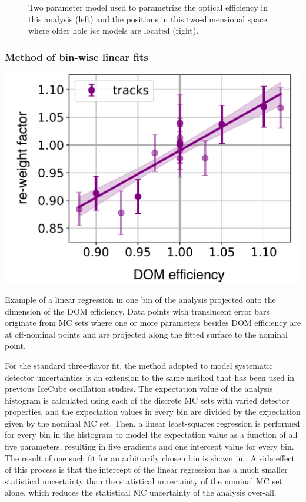 \begin{figure}
    \centering
    
    
    \caption{Two parameter model used to parametrize the optical efficiency in this analysis (left) and the positions in this two-dimensional space where older hole ice models are located (right).}
    \label{fig:hole-ice-parametrization}
\end{figure}

\subsubsection{Method of bin-wise linear fits}
\label{sec:hypersurfaces}
\begin{marginfigure}[\baselineskip]
    \includegraphics[width=\linewidth]{figures/measurement/systematics/detector/hypersurface_example_v2.pdf} 
    \caption{Example of a linear regression in one bin of the analysis projected onto the dimension of the DOM efficiency. Data points with translucent error bars originate from MC sets where one or more parameters besides DOM efficiency are at off-nominal points and are projected along the fitted surface to the nominal point.}
\end{marginfigure}
For the standard three-flavor fit, the method adopted to model systematic detector uncertainties is an extension to the same method that has been used in previous IceCube oscillation studies\cite{IceCube:2019dqi}. The expectation value of the analysis histogram is calculated using each of the discrete MC sets with varied detector properties, and the expectation values in every bin are divided by the expectation given by the nominal MC set. Then, a linear least-squares regression is performed for every bin in the histogram to model the expectation value as a function of all five parameters, resulting in five gradients and one intercept value for every bin. The result of one such fit for an arbitrarily chosen bin is shown in . A side effect of this process is that the intercept of the linear regression has a much smaller statistical uncertainty than the statistical uncertainty of the nominal MC set alone, which reduces the statistical MC uncertainty of the analysis over-all.


